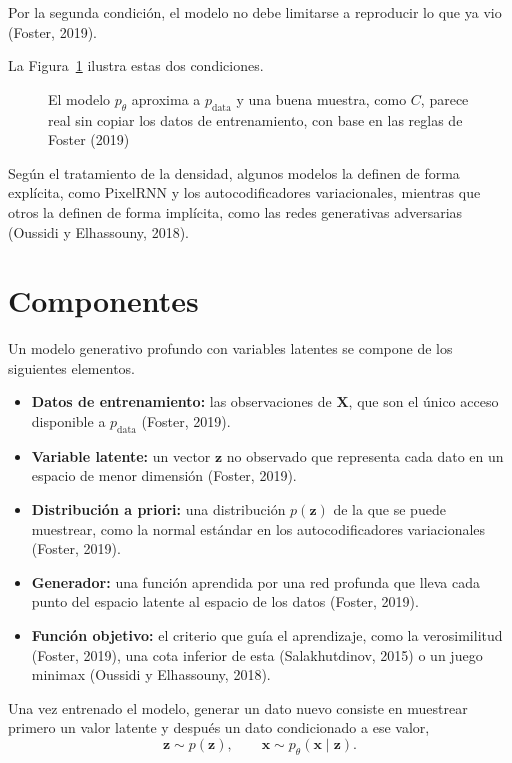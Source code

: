 \documentclass[11pt,letterpaper]{article}
\theoremstyle{definition}
\newcommand{\bx}{\mathbf{x}}
\newcommand{\bz}{\mathbf{z}}
\newcommand{\bX}{\mathbf{X}}
\newcommand{\pdata}{p_{\text{data}}}
\newcommand{\ptheta}{p_{\theta}}
\begin{document}
Por la segunda condición, el modelo no debe limitarse a reproducir lo que ya vio (Foster, 2019).

La Figura~\ref{fig:muestras} ilustra estas dos condiciones.

\begin{figure}[H]
  \centering
  
  \caption{El modelo $\ptheta$ aproxima a $\pdata$ y una buena muestra, como $C$, parece real sin copiar los datos de entrenamiento, con base en las reglas de Foster (2019)}
  \label{fig:muestras}
\end{figure}

Según el tratamiento de la densidad, algunos modelos la definen de forma explícita, como PixelRNN y los autocodificadores variacionales, mientras que otros la definen de forma implícita, como las redes generativas adversarias (Oussidi y Elhassouny, 2018).

\section{Componentes}

Un modelo generativo profundo con variables latentes se compone de los siguientes elementos.

\begin{itemize}
  \item \textbf{Datos de entrenamiento:} las observaciones de $\bX$, que son el único acceso disponible a $\pdata$ (Foster, 2019).
  \item \textbf{Variable latente:} un vector $\bz$ no observado que representa cada dato en un espacio de menor dimensión (Foster, 2019).
  \item \textbf{Distribución a priori:} una distribución $p(\bz)$ de la que se puede muestrear, como la normal estándar en los autocodificadores variacionales (Foster, 2019).
  \item \textbf{Generador:} una función aprendida por una red profunda que lleva cada punto del espacio latente al espacio de los datos (Foster, 2019).
  \item \textbf{Función objetivo:} el criterio que guía el aprendizaje, como la verosimilitud (Foster, 2019), una cota inferior de esta (Salakhutdinov, 2015) o un juego minimax (Oussidi y Elhassouny, 2018).
\end{itemize}

Una vez entrenado el modelo, generar un dato nuevo consiste en muestrear primero un valor latente y después un dato condicionado a ese valor,
\begin{equation}
  \bz \sim p(\bz), \qquad \bx \sim \ptheta(\bx \mid \bz).
\end{equation}
\end{document}
